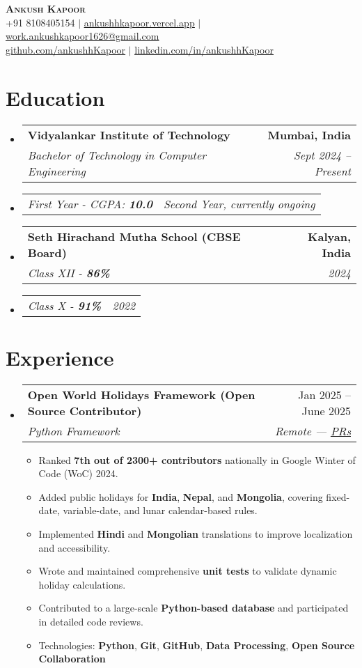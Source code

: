 \documentclass[letterpaper,11pt]{article}
\makeatletter
\newcommand{\resumeItem}[1]{
  \item\small{#1 \vspace{-2pt}}
}
\newcommand{\resumeSubheading}[4]{
  \vspace{-2pt}\item
    \begin{tabular*}{0.97\textwidth}[t]{l@{\extracolsep{\fill}}r}
      \textbf{#1} & #2 \\
      \textit{\small#3} & \textit{\small #4} \\
    \end{tabular*}\vspace{-7pt}
}
\newcommand{\resumeSubSubheading}[2]{
    \item
    \begin{tabular*}{0.97\textwidth}{l@{\extracolsep{\fill}}r}
      \textit{\small#1} & \textit{\small #2} \\
    \end{tabular*}\vspace{-5pt}
}
\newcommand{\resumeSubHeadingListStart}{\begin{itemize}[leftmargin=0.15in, label={}]}
\newcommand{\resumeSubHeadingListEnd}{\end{itemize}}
\newcommand{\resumeItemListStart}{\begin{itemize}}
\newcommand{\resumeItemListEnd}{\end{itemize}\vspace{-5pt}}
\makeatother
\begin{document}
\begin{center}
    \textbf{\Huge \scshape Ankush Kapoor} \\ \vspace{1pt}
    \small +91 8108405154 $|$  \href{https://ankushhkapoor.vercel.app}{\underline{ankushhkapoor.vercel.app}} $|$
    \href{mailto:work.ankushkapoor1626@gmail.com}{\underline{work.ankushkapoor1626@gmail.com}} \\
    \href{https://github.com/ankushhKapoor}{\underline{github.com/ankushhKapoor}} $|$
    \href{https://linkedin.com/in/ankushhKapoor}{\underline{linkedin.com/in/ankushhKapoor}}
\end{center}

\section{Education}
  \resumeSubHeadingListStart
    \resumeSubheading
      {Vidyalankar Institute of Technology}{\textbf{Mumbai, India}}
      {Bachelor of Technology in Computer Engineering}{Sept 2024 -- Present}
    \resumeSubSubheading
      {First Year - CGPA: \textbf{10.0}}{Second Year, currently ongoing}

    \resumeSubheading
      {Seth Hirachand Mutha School (CBSE Board)}{\textbf{Kalyan, India}}
      {Class XII - \textbf{86\%}}{2024}
    \resumeSubSubheading
      {Class X - \textbf{91\%}}{2022}
  \resumeSubHeadingListEnd

\section{Experience}
  \resumeSubHeadingListStart
    \resumeSubheading
      {Open World Holidays Framework (Open Source Contributor)}{Jan 2025 -- June 2025}
      {Python Framework}{Remote — \href{https://github.com/vacanza/holidays/pulls/ankushhKapoor}{\underline{PRs}}}
      \resumeItemListStart
        \resumeItem{Ranked \textbf{7th out of 2300+ contributors} nationally in Google Winter of Code (WoC) 2024.}
        \resumeItem{Added public holidays for \textbf{India}, \textbf{Nepal}, and \textbf{Mongolia}, covering fixed-date, variable-date, and lunar calendar-based rules.}
        \resumeItem{Implemented \textbf{Hindi} and \textbf{Mongolian} translations to improve localization and accessibility.}
        \resumeItem{Wrote and maintained comprehensive \textbf{unit tests} to validate dynamic holiday calculations.}
        \resumeItem{Contributed to a large-scale \textbf{Python-based database} and participated in detailed code reviews.}
        \resumeItem{Technologies: \textbf{Python}, \textbf{Git}, \textbf{GitHub}, \textbf{Data Processing}, \textbf{Open Source Collaboration}}
      \resumeItemListEnd
  \resumeSubHeadingListEnd
\end{document}
